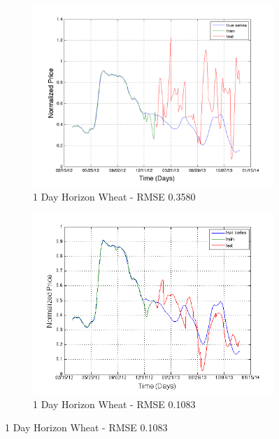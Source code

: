 \begin{figure}
        \centering
        \begin{subfigure}[b]{0.5\textwidth}
                \includegraphics[width=\textwidth]{img/model/exp2/wheat/pred_1}
                \caption{1 Day Horizon Wheat - RMSE 0.3580}
                \label{fig:gull}
        \end{subfigure}%
           \begin{subfigure}[b]{0.5\textwidth}
                \includegraphics[width=\textwidth]{img/model/exp2_final/wheat_1}
                \caption{1 Day Horizon Wheat - RMSE 0.1083}
                \label{fig:gull}
        \end{subfigure}%
              \hfill    

\end{figure}
